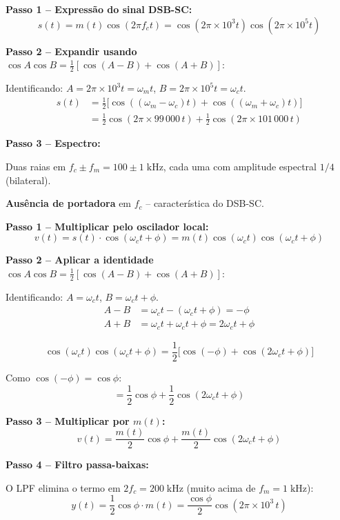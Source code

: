 \documentclass[11pt,a4paper]{article}
\begin{document}
\begin{resolucao}

\textbf{Passo 1 -- Expressão do sinal DSB-SC:}
\[
  s(t) = m(t)\cos(2\pi f_c t) = \cos(2\pi \times 10^3 t)\cos(2\pi \times 10^5 t)
\]

\textbf{Passo 2 -- Expandir usando} $\cos A \cos B = \tfrac{1}{2}[\cos(A-B) + \cos(A+B)]$:

Identificando: $A = 2\pi \times 10^3 t = \omega_m t$, \; $B = 2\pi \times 10^5 t = \omega_c t$.
\begin{align*}
  s(t) &= \frac{1}{2}\big[\cos((\omega_m - \omega_c)t) + \cos((\omega_m + \omega_c)t)\big] \\[4pt]
  &= \frac{1}{2}\cos(2\pi \times 99\,000\,t) + \frac{1}{2}\cos(2\pi \times 101\,000\,t)
\end{align*}

\textbf{Passo 3 -- Espectro:}

Duas raias em $f_c \pm f_m = 100 \pm 1\;\text{kHz}$, cada uma com amplitude espectral $1/4$ (bilateral).

\textbf{Ausência de portadora} em $f_c$ -- característica do DSB-SC.
\end{resolucao}

\begin{resolucao}

\textbf{Passo 1 -- Multiplicar pelo oscilador local:}
\[
  v(t) = s(t) \cdot \cos(\omega_c t + \phi) = m(t)\cos(\omega_c t)\cos(\omega_c t + \phi)
\]

\textbf{Passo 2 -- Aplicar a identidade} $\cos A \cos B = \tfrac{1}{2}[\cos(A-B) + \cos(A+B)]$:

Identificando: $A = \omega_c t$, \; $B = \omega_c t + \phi$.
\begin{align*}
  A - B &= \omega_c t - (\omega_c t + \phi) = -\phi \\
  A + B &= \omega_c t + \omega_c t + \phi = 2\omega_c t + \phi
\end{align*}

\[
  \cos(\omega_c t)\cos(\omega_c t + \phi) = \frac{1}{2}\big[\cos(-\phi) + \cos(2\omega_c t + \phi)\big]
\]

Como $\cos(-\phi) = \cos\phi$:
\[
  = \frac{1}{2}\cos\phi + \frac{1}{2}\cos(2\omega_c t + \phi)
\]

\textbf{Passo 3 -- Multiplicar por $m(t)$:}
\[
  v(t) = \frac{m(t)}{2}\cos\phi + \frac{m(t)}{2}\cos(2\omega_c t + \phi)
\]

\textbf{Passo 4 -- Filtro passa-baixas:}

O LPF elimina o termo em $2f_c = 200\;\text{kHz}$ (muito acima de $f_m = 1\;\text{kHz}$):
\[
  \boxed{y(t) = \frac{1}{2}\cos\phi \cdot m(t) = \frac{\cos\phi}{2}\cos(2\pi \times 10^3\,t)}
\]
\end{resolucao}
\end{document}
